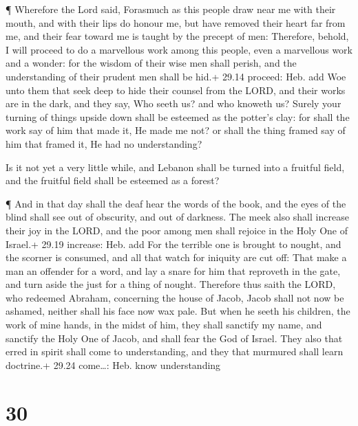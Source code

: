  ¶ Wherefore the Lord said, Forasmuch as this people draw
near me with their mouth, and with their lips do honour me, but have
removed their heart far from me, and their fear toward me is taught by
the precept of men:  Therefore, behold, I will proceed to
do a marvellous work among this people, even a marvellous work and a
wonder: for the wisdom of their wise men shall perish, and the
understanding of their prudent men shall be hid.+ 29.14 proceed: Heb.
add  Woe unto them that seek deep to hide their counsel
from the LORD, and their works are in the dark, and they say, Who seeth
us? and who knoweth us?  Surely your turning of things
upside down shall be esteemed as the potter's clay: for shall the work
say of him that made it, He made me not? or shall the thing framed say
of him that framed it, He had no understanding?

 Is it not yet a very little while, and Lebanon shall be
turned into a fruitful field, and the fruitful field shall be esteemed
as a forest?

 ¶ And in that day shall the deaf hear the words of the
book, and the eyes of the blind shall see out of obscurity, and out of
darkness.  The meek also shall increase their joy in the
LORD, and the poor among men shall rejoice in the Holy One of Israel.+
29.19 increase: Heb. add  For the terrible one is brought
to nought, and the scorner is consumed, and all that watch for iniquity
are cut off:  That make a man an offender for a word, and
lay a snare for him that reproveth in the gate, and turn aside the just
for a thing of nought.  Therefore thus saith the LORD, who
redeemed Abraham, concerning the house of Jacob, Jacob shall not now be
ashamed, neither shall his face now wax pale.  But when he
seeth his children, the work of mine hands, in the midst of him, they
shall sanctify my name, and sanctify the Holy One of Jacob, and shall
fear the God of Israel.  They also that erred in spirit
shall come to understanding, and they that murmured shall learn
doctrine.+ 29.24 come\ldots: Heb. know understanding

\hypertarget{section-29}{%
\section{30}\label{section-29}}

